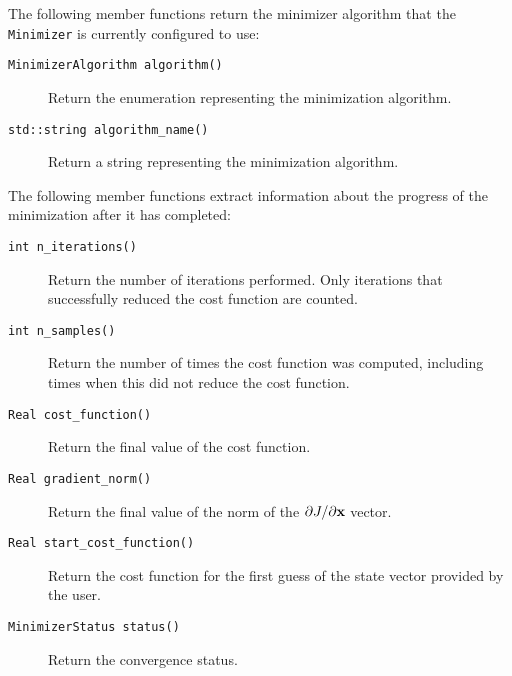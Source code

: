 \documentclass[a4,oneside]{book}
\def\codesize{\small}
\def\code#1{{\codesize\texttt{#1}}}
\def\citem#1{\item[{\codesize\texttt{#1}}]}
\begin{document}
The following member functions return the minimizer algorithm that the
\code{Minimizer} is currently configured to use:
\begin{description}
\citem{MinimizerAlgorithm algorithm()} Return the enumeration
representing the minimization algorithm.
\citem{std::string algorithm\_name()} Return a string representing the
minimization algorithm.
\end{description}
The following member functions extract information about the progress
of the minimization after it has completed:
\begin{description}
\citem{int n\_iterations()} Return the number of iterations performed.
Only iterations that successfully reduced the cost function are
counted.
%
\citem{int n\_samples()} Return the number of times the cost
function was computed, including times when this did not reduce the
cost function.
%
\citem{Real cost\_function()} Return the final value of the cost
function.
%
\citem{Real gradient\_norm()} Return the final value of the norm of
the $\partial J/\partial{\bf x}$ vector.
%
\citem{Real start\_cost\_function()} Return the cost function for the
first guess of the state vector provided by the user.
%
\citem{MinimizerStatus status()} Return the convergence status.
\end{description}
\end{document}
